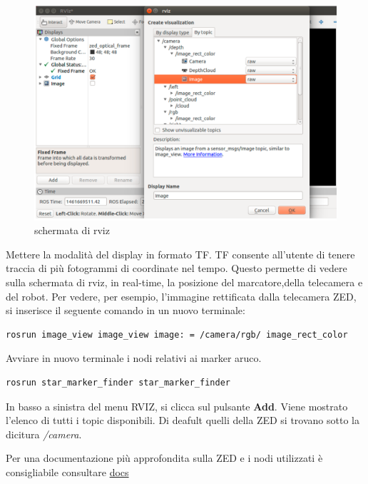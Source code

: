 \documentclass[a4paper]{article}
\begin{document}
\begin{figure}[htbp]
\centering
\includegraphics[scale=0.5]{rviz.PNG}
\caption{schermata di rviz}
\end{figure}

Mettere la modalità del display in formato TF. TF  consente all'utente di tenere traccia di più fotogrammi di coordinate nel tempo. Questo permette di vedere sulla schermata di rviz, in real-time, la posizione del marcatore,della telecamera e del robot.
Per vedere, per esempio, l'immagine rettificata dalla telecamera ZED, si inserisce il seguente comando in un nuovo terminale:

\begin{verbatim}
rosrun image_view image_view image: = /camera/rgb/ image_rect_color
\end{verbatim}
Avviare in nuovo terminale i nodi relativi ai marker aruco.
\begin{verbatim}
rosrun star_marker_finder star_marker_finder
\end{verbatim}
In basso a sinistra del menu RVIZ, si clicca sul pulsante \textbf{Add}. Viene mostrato l'elenco di tutti i topic disponibili. Di deafult quelli della ZED si trovano sotto la dicitura \textit{/camera}.

 





Per una documentazione più approfondita sulla ZED e i nodi utilizzati è consigliabile consultare 
\textcolor{red}{\href{https://www.stereolabs.com/docs/getting-started/}{docs}}
\end{document}

